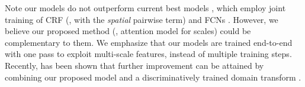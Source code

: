 Note our models do not outperform current best models \cite{lin2015efficient, liu2015semantic}, which employ joint training of CRF (\eg, with the {\it spatial} pairwise term) and FCNs \cite{chen2014learning}. However, we believe our proposed method (\eg, attention model for scales) could be complementary to them. We emphasize that our models are trained end-to-end with one pass to exploit multi-scale features, instead of multiple training steps. Recently, \cite{chen2015semantic} has been shown that further improvement can be attained by combining our proposed model and a discriminatively trained domain transform \cite{GastalOliveira2011DomainTransform}.

\begin{figure}
  \centering
\end{figure}
